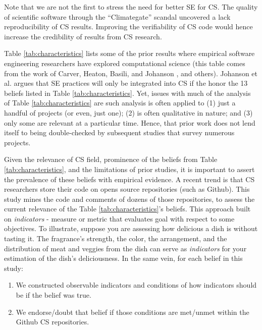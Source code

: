 \documentclass[sigconf,review,anonymous]{acmart}
\newcommand{\be}{\begin{enumerate}}
\newcommand{\ee}{\end{enumerate}}
\begin{document}
 
 Note that we are not the first to stress the need for better SE for CS. The quality of scientific software through the ``Climategate'' scandal \cite{merali10_error} uncovered a lack reproducibility of CS results. Improving the verifiability of CS code would hence increase the   credibility of results from  CS research. 




Table \ref{tab:characteristics}
lists some of the prior results
where empirical software
engineering researchers have explored computational science
(this table comes from the work of
Carver, Heaton, Basili, and Johanson \cite{carver13_perception, carver07_environment, basili08_hpc, heaton15_lit, johan18_secs}, and others).
Johanson et al. \cite{johan18_secs}   argues that SE practices will only be integrated into CS if the honor the 13 beliefs listed in
Table \ref{tab:characteristics}. Yet, issues with much of the analysis of Table \ref{tab:characteristics} are such analysis is often applied to (1) just a handful of projects (or even, just one); (2) is often qualitative in nature; and (3) only some are relevant at a particular time. Hence, that prior work does not lend itself to being double-checked by subsequent studies that survey numerous projects. 


Given the relevance of CS field, prominence of the beliefs
from Table \ref{tab:characteristics}, and the limitations of prior studies, it is important to assert the prevalence of these beliefs with empirical evidence. A recent trend is that CS researchers store their code on opens source repositories (such as Github). This study mines the code and comments of dozens of those repositories, to assess the current relevance of the Table \ref{tab:characteristics}'s beliefs. This approach built on \textit{indicators} -  measure or metric that evaluates goal with respect to some objectives. To illustrate, suppose you are assessing how delicious a dish is without tasting it. The fragrance's strength, the color, the arrangement, and the distribution of meat and veggies from the dish can serve as \textit{indicators} for your estimation of the dish's deliciousness. In the same vein, for each belief in this study:
\be
\item We constructed observable indicators and conditions of how indicators should be if the belief was true.   
\item We endorse/doubt that belief if those conditions are met/unmet within the Github CS repositories.
\ee
\end{document}
